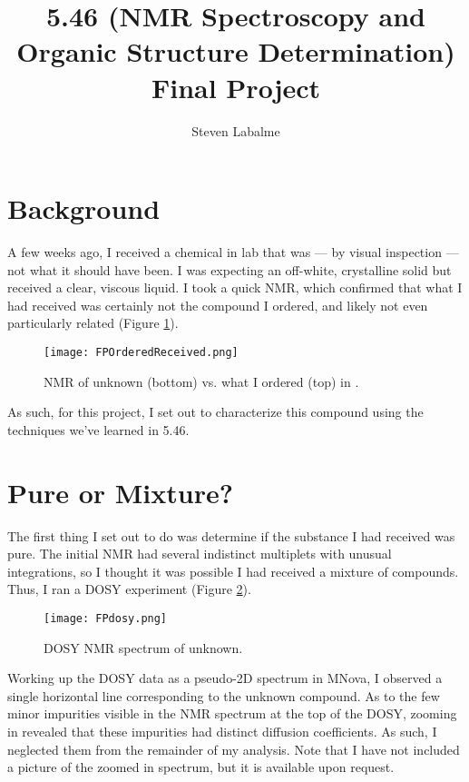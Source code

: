 \documentclass[titlepage]{article}
\title{5.46 (NMR Spectroscopy and Organic Structure Determination) Final Project}
\author{Steven Labalme}
\begin{document}
\maketitle



\tableofcontents
\newpage
\listoffigures
\newpage



\pagestyle{main}
\renewcommand{\leftmark}{Final Project}
\section{Background}
A few weeks ago, I received a chemical in lab that was --- by visual inspection --- not what it should have been. I was expecting an off-white, crystalline solid but received a clear, viscous liquid. I took a quick  NMR, which confirmed that what I had received was certainly not the compound I ordered, and likely not even particularly related (Figure \ref{fig:FPOrderedReceived}).
\begin{figure}[H]
    \centering
    \texttt{[image: FPOrderedReceived.png]}
    \caption{ NMR of unknown (bottom) vs. what I ordered (top) in .}
    \label{fig:FPOrderedReceived}
\end{figure}
As such, for this project, I set out to characterize this compound using the techniques we've learned in 5.46.



\section{Pure or Mixture?}
The first thing I set out to do was determine if the substance I had received was pure. The initial  NMR had several indistinct multiplets with unusual integrations, so I thought it was possible I had received a mixture of compounds. Thus, I ran a DOSY experiment (Figure \ref{fig:FPdosy}).
\begin{figure}[H]
    \centering
    \texttt{[image: FPdosy.png]}
    \caption{DOSY NMR spectrum of unknown.}
    \label{fig:FPdosy}
\end{figure}
Working up the DOSY data as a pseudo-2D spectrum in MNova, I observed a single horizontal line corresponding to the unknown compound. As to the few minor impurities visible in the  NMR spectrum at the top of the DOSY, zooming in revealed that these impurities had distinct diffusion coefficients. As such, I neglected them from the remainder of my analysis. Note that I have not included a picture of the zoomed in spectrum, but it is available upon request.
\end{document}
